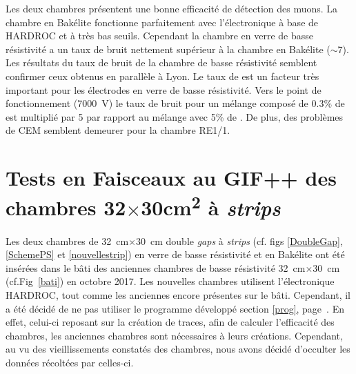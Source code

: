 Les deux chambres présentent une bonne efficacité de détection des muons. La chambre en Bakélite fonctionne parfaitement avec l'électronique à base de HARDROC et à très bas seuils. Cependant la chambre en verre de basse résistivité a un taux de bruit nettement supérieur à la chambre en Bakélite ($\sim$\num{7}). Les résultats du taux de bruit de la chambre de basse résistivité semblent confirmer ceux obtenus en parallèle à Lyon. Le taux de  est un facteur très important pour les électrodes en verre de basse résistivité. Vers le point de fonctionnement (\SI{7000}{\volt}) le taux de bruit pour un mélange composé de \num{0.3}\% de  est multiplié par \num{5} par rapport au mélange avec \num{5}\% de . De plus, des problèmes de CEM semblent demeurer pour la chambre RE1/1.


\section{Tests en Faisceaux au GIF++ des chambres \texorpdfstring{\num{32}$\times$\num{30}\si{\square\centi\meter}}{32cm x 30cm} à \textit{strips}}
\label{GIFF4}
\label{smallchamber}

Les deux chambres de \SI{32}{\centi\meter}$\times$\SI{30}{\centi\meter} double \textit{gaps} à \textit{strips} (cf. figs \ref{DoubleGap}, \ref{SchemePS} et \ref{nouvellestrip}) en verre de basse résistivité et en Bakélite ont été insérées dans le bâti des anciennes chambres de basse résistivité \SI{32}{\centi\meter}$\times$\SI{30}{\centi\meter} (cf.Fig~\ref{bati}) en octobre 2017. Les nouvelles chambres utilisent l'électronique HARDROC, tout comme les anciennes encore présentes sur le bâti. Cependant, il a été décidé de ne pas utiliser le programme développé section \ref{prog}, page~\pageref{prog}. En effet, celui-ci reposant sur la création de traces, afin de calculer l'efficacité des chambres, les anciennes chambres sont nécessaires à leurs créations. Cependant, au vu des vieillissements constatés des chambres, nous avons décidé d'occulter les données récoltées par celles-ci.

